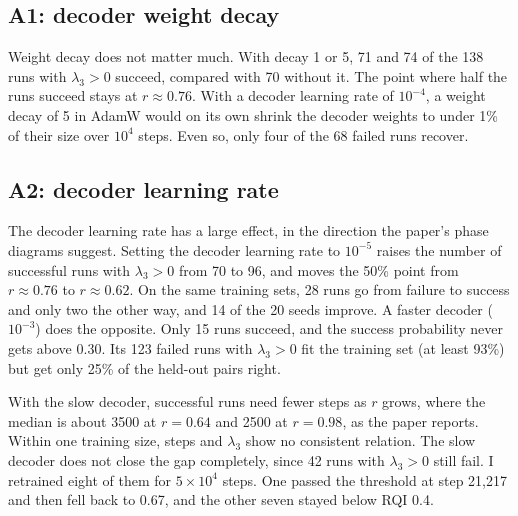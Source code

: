\subsection{A1: decoder weight decay}
\label{sec:abl-wd}

Weight decay does not matter much. With decay 1 or 5, 71 and 74 of the 138 runs
with $\lambda_3 > 0$ succeed, compared with 70 without it. The point where
half the runs succeed stays at $r \approx 0.76$. With a decoder learning rate of $10^{-4}$, a weight decay of
5 in AdamW would on its own shrink the decoder weights to under 1\% of their
size over $10^4$ steps. Even so, only four of the 68 failed runs recover.

\subsection{A2: decoder learning rate}
\label{sec:abl-lr}

The decoder learning rate has a large effect, in the direction the paper's
phase diagrams suggest. Setting the decoder learning rate to $10^{-5}$ raises the
number of successful runs with $\lambda_3 > 0$ from 70 to 96, and moves the
50\% point from $r \approx 0.76$ to $r \approx 0.62$. On the same training
sets, 28 runs go from failure to success and only two the other way, and
14 of the 20 seeds improve. A
faster decoder ($10^{-3}$) does the opposite. Only 15 runs succeed, and the
success probability never gets above 0.30. Its 123 failed runs with $\lambda_3 > 0$ fit the training set (at least
93\%) but get only 25\% of the held-out pairs right.

With the slow decoder, successful runs need fewer steps as $r$ grows, where the median is about 3500 at $r = 0.64$ and 2500 at $r = 0.98$, as the paper reports. Within
one training size, steps and $\lambda_3$ show no consistent relation. The slow decoder does not close the gap completely, since 42 runs with
$\lambda_3 > 0$ still fail. I retrained eight of them for $5 \times 10^4$
steps. One passed the threshold at step 21,217 and
then fell back to 0.67, and the other seven stayed below RQI 0.4.
